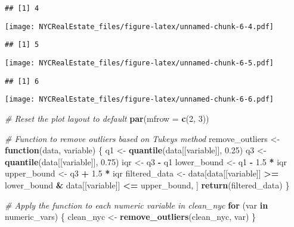 \documentclass[
]{article}
\newenvironment{Shaded}{\begin{snugshade}}{\end{snugshade}}
\newcommand{\AttributeTok}[1]{\textcolor[rgb]{0.13,0.29,0.53}{#1}}
\newcommand{\CommentTok}[1]{\textcolor[rgb]{0.56,0.35,0.01}{\textit{#1}}}
\newcommand{\ControlFlowTok}[1]{\textcolor[rgb]{0.13,0.29,0.53}{\textbf{#1}}}
\newcommand{\DecValTok}[1]{\textcolor[rgb]{0.00,0.00,0.81}{#1}}
\newcommand{\FloatTok}[1]{\textcolor[rgb]{0.00,0.00,0.81}{#1}}
\newcommand{\FunctionTok}[1]{\textcolor[rgb]{0.13,0.29,0.53}{\textbf{#1}}}
\newcommand{\NormalTok}[1]{#1}
\newcommand{\OtherTok}[1]{\textcolor[rgb]{0.56,0.35,0.01}{#1}}
\newcommand{\SpecialCharTok}[1]{\textcolor[rgb]{0.81,0.36,0.00}{\textbf{#1}}}
\begin{document}
\begin{verbatim}
## [1] 4
\end{verbatim}

\texttt{[image: NYCRealEstate\_files/figure-latex/unnamed-chunk-6-4.pdf]}

\begin{verbatim}
## [1] 5
\end{verbatim}

\texttt{[image: NYCRealEstate\_files/figure-latex/unnamed-chunk-6-5.pdf]}

\begin{verbatim}
## [1] 6
\end{verbatim}

\texttt{[image: NYCRealEstate\_files/figure-latex/unnamed-chunk-6-6.pdf]}

\begin{Shaded}
\begin{Highlighting}[]
\CommentTok{\# Reset the plot layout to default}
\FunctionTok{par}\NormalTok{(}\AttributeTok{mfrow =} \FunctionTok{c}\NormalTok{(}\DecValTok{2}\NormalTok{, }\DecValTok{3}\NormalTok{))}
\end{Highlighting}
\end{Shaded}

\begin{Shaded}
\begin{Highlighting}[]
\CommentTok{\# Function to remove outliers based on Tukey\textquotesingle{}s method}
\NormalTok{remove\_outliers }\OtherTok{\textless{}{-}} \ControlFlowTok{function}\NormalTok{(data, variable) \{}
\NormalTok{  q1 }\OtherTok{\textless{}{-}} \FunctionTok{quantile}\NormalTok{(data[[variable]], }\FloatTok{0.25}\NormalTok{)}
\NormalTok{  q3 }\OtherTok{\textless{}{-}} \FunctionTok{quantile}\NormalTok{(data[[variable]], }\FloatTok{0.75}\NormalTok{)}
\NormalTok{  iqr }\OtherTok{\textless{}{-}}\NormalTok{ q3 }\SpecialCharTok{{-}}\NormalTok{ q1}
\NormalTok{  lower\_bound }\OtherTok{\textless{}{-}}\NormalTok{ q1 }\SpecialCharTok{{-}} \FloatTok{1.5} \SpecialCharTok{*}\NormalTok{ iqr}
\NormalTok{  upper\_bound }\OtherTok{\textless{}{-}}\NormalTok{ q3 }\SpecialCharTok{+} \FloatTok{1.5} \SpecialCharTok{*}\NormalTok{ iqr}
\NormalTok{  filtered\_data }\OtherTok{\textless{}{-}}\NormalTok{ data[data[[variable]] }\SpecialCharTok{\textgreater{}=}\NormalTok{ lower\_bound }\SpecialCharTok{\&}\NormalTok{ data[[variable]] }\SpecialCharTok{\textless{}=}\NormalTok{ upper\_bound, ]}
  \FunctionTok{return}\NormalTok{(filtered\_data)}
\NormalTok{\}}

\CommentTok{\# Apply the function to each numeric variable in clean\_nyc}
\ControlFlowTok{for}\NormalTok{ (var }\ControlFlowTok{in}\NormalTok{ numeric\_vars) \{}
\NormalTok{  clean\_nyc }\OtherTok{\textless{}{-}} \FunctionTok{remove\_outliers}\NormalTok{(clean\_nyc, var)}
\NormalTok{\}}
\end{Highlighting}
\end{Shaded}
\end{document}
